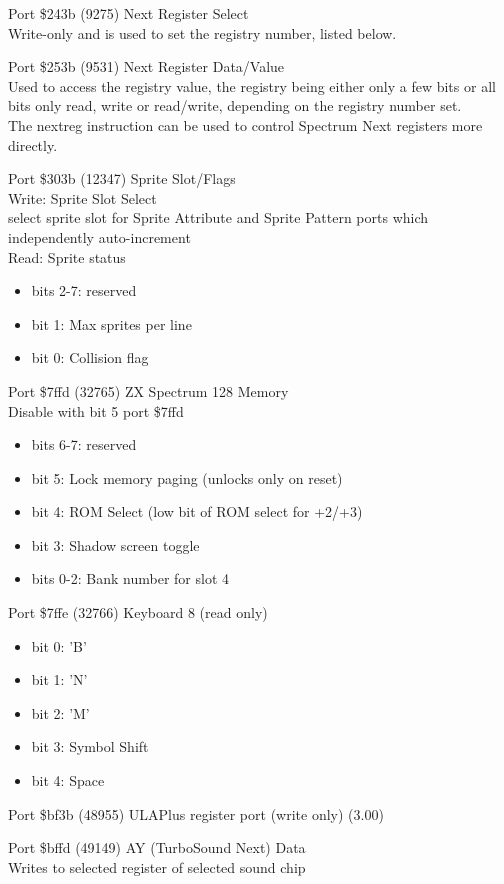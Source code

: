 Port \$243b (9275) Next Register Select\\
Write-only and is used to set the registry number, listed below.

Port \$253b (9531) Next Register Data/Value\\
Used to access the registry value, the registry being either only a
few bits or all bits only read, write or read/write, depending on the
registry number set.\\
The nextreg instruction can be used to control Spectrum Next registers
more directly.

Port \$303b (12347) Sprite Slot/Flags\\
Write: Sprite Slot Select\\
select sprite slot for Sprite Attribute and Sprite Pattern ports which
independently auto-increment\\
Read: Sprite status
\begin{itemize}
\item[] bits 2-7: reserved
\item[] bit 1: Max sprites per line
\item[] bit 0: Collision flag
\end{itemize}

Port \$7ffd (32765) ZX Spectrum 128 Memory\\
Disable with bit 5 port \$7ffd
\begin{itemize}
\item[] bits 6-7: reserved
\item[] bit 5: Lock memory paging (unlocks only on reset)
\item[] bit 4: ROM Select (low bit of ROM select for +2/+3)
\item[] bit 3: Shadow screen toggle
\item[] bits 0-2: Bank number for slot 4
\end{itemize}

Port \$7ffe (32766) Keyboard 8 (read only)
\begin{itemize}
\item[] bit 0: 'B'
\item[] bit 1: 'N'
\item[] bit 2: 'M'
\item[] bit 3: Symbol Shift
\item[] bit 4: Space
\end{itemize}

Port \$bf3b (48955) ULAPlus register port (write only) (3.00)

Port \$bffd (49149) AY (TurboSound Next) Data\\
Writes to selected register of selected sound chip

